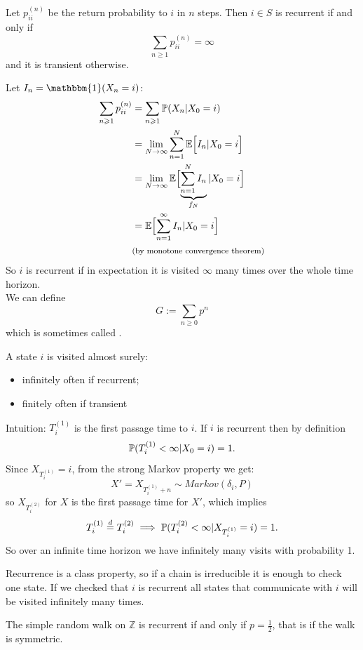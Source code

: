 \documentclass{article}
\begin{document}
\begin{proposition}
    Let $p_{ii}^{(n)}$ be the return probability to $i$ in $n$ steps. Then $i \in S$ is recurrent if and only if \[\sum_{n\geqslant 1} p_{ii}^{(n)}=\infty \] and it is transient otherwise.
\end{proposition}
Let $I_n=\mathbbm{1}(X_n=i)$:
\begin{align*}
    \sum_{n\geqslant 1} p_{ii}^{(n)}&=\sum_{n\geqslant 1} \prob(X_n|X_0=i)\\
    &=\lim_{N \to \infty}\sum_{n=1}^N\ev{I_n|X_0=i}\\
    &=\lim_{N \to \infty}\ev{\underbrace{\sum_{n=1}^NI_n}_{\mathclap{f_N}}|X_0=i}\\
    &=\ev{\sum_{n=1}^{\infty}I_n|X_0=i}\\
    &\text{\footnotesize(by monotone convergence theorem)}
\end{align*}
So $i$ is recurrent if in expectation it is visited $\infty$ many times over the whole time horizon. \\
We can define \[G:=\sum_{n\geqslant 0}p^n\] which is sometimes called .

\begin{proposition}
    A state $i$ is visited almost surely:
    \begin{itemize}
        \item infinitely often if recurrent;
        \item finitely often if transient
    \end{itemize}
\end{proposition}
Intuition: $T_i^{(1)}$ is the first passage time to $i$. If $i$ is recurrent then by definition
\[
\mathbb{P}(T_i^{(1)}<\infty|X_0=i)=1.
\]
Since $X_{T_i^{(1)}}=i$, from the strong Markov property we get: \[X'=X_{T_i^{(1)}+n}\sim Markov(\delta_i,P)\]
so $X_{T_i^{(2)}}$ for $X$ is the first passage time for $X'$, which implies 
\[T_i^{(1)}\stackrel{d}{=}T_i^{(2)} \implies \mathbb{P}(T_i^{(2)}<\infty|X_{T_i^{(1)}}=i)=1.\]
So over an infinite time horizon we have infinitely many visits with probability 1.

Recurrence is a class property, so if a chain is irreducible it is enough to check one state. If we checked that $i$ is recurrent all states that communicate with $i$ will be visited infinitely many times.

\begin{proposition}
    The simple random walk on $\mathbb{Z}$ is recurrent if and only if $p=\frac{1}{2}$, that is if the walk is symmetric. 
\end{proposition}
\end{document}

